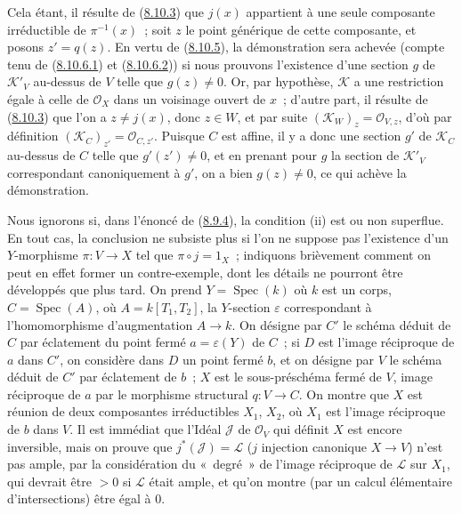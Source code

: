\begin{env}[8.10.6]
Cela étant, il résulte de (\hyperref[II.8.10.3-fr]{8.10.3}) que $j(x)$
appartient à une seule composante irréductible de $\pi^{-1}(x)$~; soit $z$ le
point générique de cette composante, et posons $z'=q(z)$. En vertu de
(\hyperref[II.8.10.5-fr]{8.10.5}), la démonstration sera achevée (compte tenu
de (\hyperref[II.8.10.6.1-fr]{8.10.6.1}) et
(\hyperref[II.8.10.6.2-fr]{8.10.6.2})) si nous prouvons l'existence d'une
section $g$ de $\mathcal{K}'_V$ au-dessus de $V$ telle que $g(z)\neq0$. Or,
par hypothèse, $\mathcal{K}$ a une restriction égale à celle de
$\mathcal{O}_X$ dans un voisinage ouvert de $x$~; d'autre part, il résulte de
(\hyperref[II.8.10.3-fr]{8.10.3}) que l'on a $z\neq j(x)$, donc $z\in W$, et
par suite $(\mathcal{K}_W)_z=\mathcal{O}_{V,z}$, d'où par définition
$(\mathcal{K}_C)_{z'}=\mathcal{O}_{C,z'}$. Puisque $C$ est affine, il y a donc
une section $g'$ de $\mathcal{K}_C$ au-dessus de $C$ telle que
$g'(z')\neq0$, et en prenant pour $g$ la section de $\mathcal{K}'_V$
correspondant canoniquement à $g'$, on a bien $g(z)\neq0$, ce qui achève la
démonstration.
\end{env}

\begin{remark}[8.10.7]
\label{II.8.10.7-fr}
Nous ignorons si, dans l'énoncé de (\hyperref[II.8.9.4-fr]{8.9.4}), la
condition (ii) est ou non superflue. En tout cas, la conclusion ne subsiste
plus si l'on ne suppose pas l'existence d'un $Y$-morphisme $\pi:V\to X$ tel
que $\pi\circ j=1_X$~; indiquons brièvement comment on peut en effet former un
contre-exemple, dont les détails ne pourront être développés que plus tard.
On prend $Y=\operatorname{Spec}(k)$ où $k$ est un corps,
$C=\operatorname{Spec}(A)$, où $A=k[T_1,T_2]$, la $Y$-section $\varepsilon$
correspondant à l'homomorphisme d'augmentation $A\to k$. On désigne par $C'$
le schéma déduit de $C$ par éclatement du point fermé $a=\varepsilon(Y)$ de
$C$~; si $D$ est l'image réciproque de $a$ dans $C'$, on considère dans $D$
un point fermé $b$,
et on désigne par $V$ le schéma déduit de $C'$ par éclatement de $b$~; $X$ est
le sous-préschéma fermé de $V$, image réciproque de $a$ par le morphisme
structural $q:V\to C$. On montre que $X$ est réunion de deux composantes
irréductibles $X_1$, $X_2$, où $X_1$ est l'image réciproque de $b$ dans $V$.
Il est immédiat que l'Idéal $\mathcal{J}$ de $\mathcal{O}_V$ qui définit $X$
est encore inversible, mais on prouve que
$j^*(\mathcal{J})=\mathcal{L}$ ($j$ injection canonique $X\to V$) n'est pas
ample, par la considération du «~degré~» de l'image réciproque de
$\mathcal{L}$ sur $X_1$, qui devrait être $>0$ si $\mathcal{L}$ était ample,
et qu'on montre (par un calcul élémentaire d'intersections) être égal à 0.
\end{remark}

